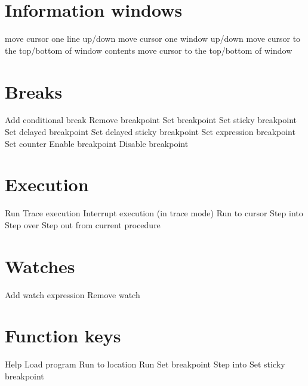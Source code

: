 \section{Information windows}

\KeyListBegin{8 cm}
 {move cursor one line up/down}
 {move cursor one window up/down}
 {move cursor to the top/bottom of window contents}
 {move cursor to the top/bottom of window}
\KeyListEnd{}

\section{Breaks}

\KeyListBegin{8 cm}
 {Add conditional break}
 {Remove breakpoint}
 {Set breakpoint}
 {Set sticky breakpoint}
 {Set delayed breakpoint}
 {Set delayed sticky breakpoint}
 {Set expression breakpoint}
 {Set counter}
 {Enable breakpoint}
 {Disable breakpoint}
\KeyListEnd{}

\section{Execution}

\KeyListBegin{8 cm}
 {Run}
 {Trace execution}
 {Interrupt execution (in trace mode)}
 {Run to cursor}
 {Step into}
 {Step over}
 {Step out from current procedure}
\KeyListEnd{}

\section{Watches}

\KeyListBegin{8 cm}
 {Add watch expression}
 {Remove watch}
\KeyListEnd{}

\section{Function keys}

\KeyListBegin{8 cm}
 {Help}
 {Load program}
 {Run to location}
 {Run}
 {Set breakpoint}
 {Step into}
 {Set sticky breakpoint}
\KeyListEnd{}

